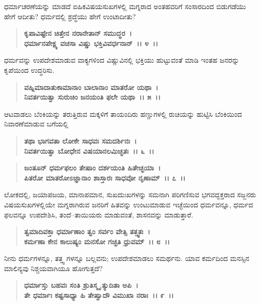 ಧರ್ಮಾಚರಣೆಯನ್ನು ಮಾಡದೆ ಐಹಿಕವಿಷಯಸುಖಗಳಲ್ಲಿ ಮಗ್ನರಾದ ಅಂತಹವರಿಗೆ ಸಂಸಾರದಿಂದ ಬಿಡುಗಡೆಯು ಹೇಗೆ ಆದೀತು? ಧರ್ಮದಲ್ಲಿ ಶ್ರದ್ಧೆಯು ಹೇಗೆ ಉಂಟಾದೀತು?

\begin{verse}
\textbf{ಕೃಪಾವಿಷ್ಟೇನ ಚಿತ್ತೇನ ನರಾನೇತಾನ್ ಸಮುದ್ಧರ~।}\\\textbf{ಧರ್ಮಾನಪೇಕ್ಷ್ಯ ವಚಸಾ ವಿಷ್ಣು ಭಕ್ತಿವಿವರ್ಧನಾನ್~।। ೪~।।}
\end{verse}

ಧರ್ಮವನ್ನು ಉಪದೇಶಮಾಡುವ ವಾಕ್ಯಗಳಿಂದ ವಿಷ್ಣುವಿನಲ್ಲಿ ಭಕ್ತಿಯು ಹುಟ್ಟುವಂತೆ ಮಾಡಿ ಇಂತಹ ಜನರನ್ನು ಕೃಪೆಯಿಂದ ಉದ್ಧರಿಸು.

\begin{verse}
\textbf{ವಹ್ನಿಮಾದಾತುಕಾಮಾನಾಂ ಬಾಲಾನಾಂ ಮಾತರೋ ಯಥಾ~।}\\\textbf{ನಿವರ್ತಯಿತ್ವಾ ಸುರುಚಿಂ ಜನಯಂತಿ ಫಲೇ ಯಥಾ~।। ೫~।।}
\end{verse}

ಆಟವಾಡಲು ಬೆಂಕಿಯನ್ನು ತರುತ್ತಿರುವ ಮಕ್ಕಳಿಗೆ ತಾಯಂದಿರು ಹಣ್ಣುಗಳಲ್ಲಿ ರುಚಿಯನ್ನು ಹುಟ್ಟಿಸಿ ಬೆಂಕಿಯಿಂದ ನಿವಾರಣೆಮಾಡುವ ಬಗೆಯಲ್ಲಿ

\begin{verse}
\textbf{ತಥಾ ಭಾಗವತಾ ಲೋಕೇ ಸಾಧವಃ ಸಮದರ್ಶಿನಃ~।}\\\textbf{ನಿವರ್ತಯಿತ್ವಾ ಬೋಧೇನ ವಿಷಯಾನಲಮಿಚ್ಛತಃ~।। ೬~।।}
\end{verse}

\begin{verse}
\textbf{ಜಂತೂನ್ ಧರ್ಮಫಲಂ ತೇಷಾಂ ದರ್ಶಯಂತಿ ಹಿತೇಚ್ಛಯಾ~।}\\\textbf{ಪಿತರೋ ಮಾತರೋಽಜ್ಞಾನಾಂ ಶಾಸ್ತಾರಃ ಸಾಧವೋ ನೃಣಾಮ್~।। ೭~।।}
\end{verse}

ಲೋಕದಲ್ಲಿ, ಜಯಾಪಜಯ, ಮಾನಾಪಮಾನ, ಸುಖದುಃಖಗಳನ್ನು ಸಮನಾಗಿ ಪರಿಗಣಿಸುವ ಭಗವದ್ಭಕ್ತರಾದ ಸಜ್ಜನರು ವಿಷಯಸುಖಗಳಲ್ಲಿಯೇ ಮಗ್ನರಾಗಿರುವ ಜನರಿಗೆ ಹಿತವನ್ನು ಉಂಟುಮಾಡುವ ಇಚ್ಛೆಯಿಂದ ಧರ್ಮವನ್ನೂ, ಧರ್ಮದ ಫಲವನ್ನೂ ಉಪದೇಶಿಸಿ, ತಂದೆ–ತಾಯಿಯರು ಮಾಡುವಂತೆ, ಶಾಸನವನ್ನು ಮಾಡುತ್ತಾರೆ.

\begin{verse}
\textbf{ತ್ವಮಾದಿವಕ್ತಾ ಧರ್ಮಾಣಾಂ ತ್ವಂ ಸರ್ವಂ ವೇತ್ಸಿ ತತ್ತ್ವತಃ~।}\\\textbf{ಕರ್ಮಣಾ ಕೇನ ಕಾಲುಷ್ಯಂ ಮನಸೋ ಗಚ್ಛತಿ ಧ್ರುವಮ್~।। ೮~।।}
\end{verse}

ನೀನು ಧರ್ಮಗಳನ್ನೂ, ತತ್ತ್ವ ಗಳನ್ನೂ ಬಲ್ಲವನು; ಉಪದೇಶಮಾಡಲು ಸಮರ್ಥನು. ಯಾವ ಕರ್ಮದಿಂದ ಮನಸ್ಸಿನ ಮಾಲಿನ್ಯವು ನಿಶ್ಚಯವಾಗಿಯೂ ಹೋಗುತ್ತದೆ?

\begin{verse}
\textbf{ಧರ್ಮಾಸ್ತು ಬಹವಃ ಸಂತಿ ಶ್ರುತಿಸ್ಮೃ ತ್ಯುದಿತಾ ಅಪಿ~।}\\\textbf{ತೇ ಧರ್ಮಾಃ ಕಷ್ಟಸಾಧ್ಯಾ ಹಿ ತೇಷ್ವಾದೌ ವಿಮುಖಾ ನರಾಃ~।। ೯~।।}
\end{verse}

